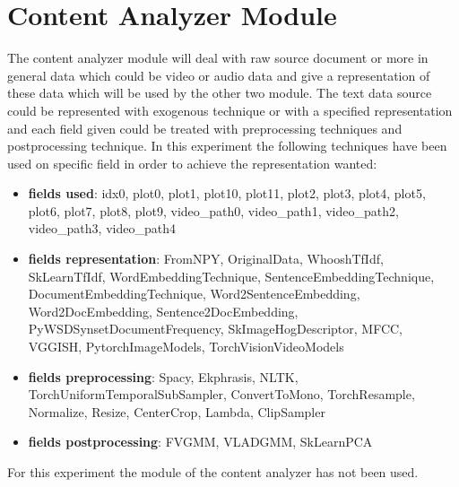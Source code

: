 

\section{Content Analyzer Module}\label{sec:ca}
The content analyzer module will deal with raw source document or more in general data which could be
video or audio data and give a representation of these data which will be used by the other two module.
The text data source could be represented with exogenous technique or with a specified representation
and each field given could be treated with preprocessing techniques and postprocessing technique.
In this experiment the following techniques have been used on specific field in order to achieve the
representation wanted:
\hfill\break
\hfill\break


\begin{itemize}
    \item \textbf{fields used}:  idx0, plot0, plot1, plot10, plot11, plot2, plot3, plot4, plot5, plot6, plot7, plot8, plot9, video\_path0, video\_path1, video\_path2, video\_path3, video\_path4

    \item \textbf{fields representation}:  FromNPY, OriginalData, WhooshTfIdf, SkLearnTfIdf, WordEmbeddingTechnique, SentenceEmbeddingTechnique, DocumentEmbeddingTechnique, Word2SentenceEmbedding, Word2DocEmbedding, Sentence2DocEmbedding, PyWSDSynsetDocumentFrequency, SkImageHogDescriptor, MFCC, VGGISH, PytorchImageModels, TorchVisionVideoModels

    \item \textbf{fields preprocessing}:  Spacy, Ekphrasis, NLTK, TorchUniformTemporalSubSampler, ConvertToMono, TorchResample, Normalize, Resize, CenterCrop, Lambda, ClipSampler

    \item \textbf{fields postprocessing}:  FVGMM, VLADGMM, SkLearnPCA
\end{itemize}


For this experiment the module of the content analyzer has not been used.
\hfill\break
\hfill\break



